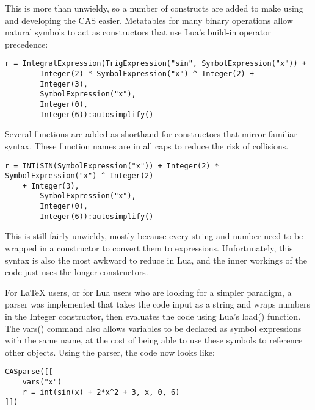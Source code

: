 \documentclass{article}
\begin{document}
This is more than unwieldy, so a number of constructs are added to make using and developing the CAS easier. Metatables for many binary operations allow natural symbols to act as constructors that use Lua's build-in operator precedence:

\begin{verbatim}
r = IntegralExpression(TrigExpression("sin", SymbolExpression("x")) +
        Integer(2) * SymbolExpression("x") ^ Integer(2) +
        Integer(3),
        SymbolExpression("x"),
        Integer(0),
        Integer(6)):autosimplify()
\end{verbatim}

Several functions are added as shorthand for constructors that mirror familiar syntax. These function names are in all caps to reduce the risk of collisions.

\begin{verbatim}
r = INT(SIN(SymbolExpression("x")) + Integer(2) * SymbolExpression("x") ^ Integer(2) 
    + Integer(3),
        SymbolExpression("x"),
        Integer(0),
        Integer(6)):autosimplify()
\end{verbatim}

This is still fairly unwieldy, mostly because every string and number need to be wrapped in a constructor to convert them to expressions. Unfortunately, this syntax is also the most awkward to reduce in Lua, and the inner workings of the code just uses the longer constructors.

For \LaTeX{} users, or for Lua users who are looking for a simpler paradigm, a parser was implemented that takes the code input as a string and wraps numbers in the {\ttfamily Integer} constructor, then evaluates the code using Lua's {\ttfamily load()} function. The {\ttfamily vars()} command also allows variables to be declared as symbol expressions with the same name, at the cost of being able to use these symbols to reference other objects. Using the parser, the code now looks like:

\begin{verbatim}
CASparse([[
    vars("x")
    r = int(sin(x) + 2*x^2 + 3, x, 0, 6)
]])
\end{verbatim}
\end{document}
